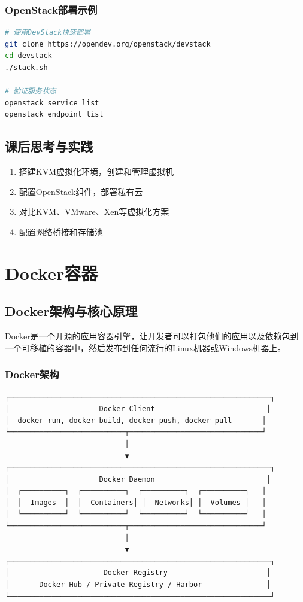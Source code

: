 \documentclass[12pt,UTF8]{ctexbook}
\begin{document}
\subsection*{OpenStack部署示例}

\begin{lstlisting}[language=bash]
# 使用DevStack快速部署
git clone https://opendev.org/openstack/devstack
cd devstack
./stack.sh

# 验证服务状态
openstack service list
openstack endpoint list
\end{lstlisting}

\section{课后思考与实践}
\label{sec:virtualization-practice}
\begin{enumerate}
    \item 搭建KVM虚拟化环境，创建和管理虚拟机
    \item 配置OpenStack组件，部署私有云
    \item 对比KVM、VMware、Xen等虚拟化方案
    \item 配置网络桥接和存储池
\end{enumerate}

\chapter{Docker容器}
\label{chap:docker}

\section{Docker架构与核心原理}
\label{sec:docker-architecture}

Docker是一个开源的应用容器引擎，让开发者可以打包他们的应用以及依赖包到一个可移植的容器中，然后发布到任何流行的Linux机器或Windows机器上。

\subsection{Docker架构}

\begin{lstlisting}
┌─────────────────────────────────────────────────────────────┐
│                     Docker Client                          │
│  docker run, docker build, docker push, docker pull       │
└───────────────────────────┬───────────────────────────────┘
                            │
                            ▼
┌─────────────────────────────────────────────────────────────┐
│                     Docker Daemon                          │
│  ┌──────────┐  ┌──────────┐  ┌──────────┐  ┌──────────┐   │
│  │  Images  │  │  Containers│ │  Networks│ │  Volumes │   │
│  └──────────┘  └──────────┘  └──────────┘  └──────────┘   │
└───────────────────────────┬───────────────────────────────┘
                            │
                            ▼
┌─────────────────────────────────────────────────────────────┐
│                      Docker Registry                       │
│       Docker Hub / Private Registry / Harbor               │
└─────────────────────────────────────────────────────────────┘
\end{lstlisting}
\end{document}
